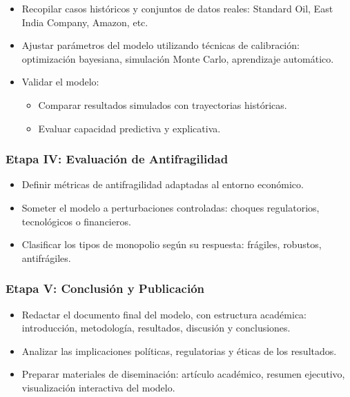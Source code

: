 \documentclass[a4paper,12pt]{article}
\begin{document}
\begin{enumerate}
\begin{itemize}
    \item Recopilar casos históricos y conjuntos de datos reales: Standard Oil, East India Company, Amazon, etc.
    \item Ajustar parámetros del modelo utilizando técnicas de calibración: optimización bayesiana, simulación Monte Carlo, aprendizaje automático.
    \item Validar el modelo:
    \begin{itemize}
        \item Comparar resultados simulados con trayectorias históricas.
        \item Evaluar capacidad predictiva y explicativa.
    \end{itemize}
\end{itemize}

\subsubsection*{Etapa IV: Evaluación de Antifragilidad}

\begin{itemize}
    \item Definir métricas de antifragilidad adaptadas al entorno económico.
    \item Someter el modelo a perturbaciones controladas: choques regulatorios, tecnológicos o financieros.
    \item Clasificar los tipos de monopolio según su respuesta: frágiles, robustos, antifrágiles.
\end{itemize}

\subsubsection*{Etapa V: Conclusión y Publicación}

\begin{itemize}
    \item Redactar el documento final del modelo, con estructura académica: introducción, metodología, resultados, discusión y conclusiones.
    \item Analizar las implicaciones políticas, regulatorias y éticas de los resultados.
    \item Preparar materiales de diseminación: artículo académico, resumen ejecutivo, visualización interactiva del modelo.
\end{itemize}

\end{enumerate}
\end{document}
